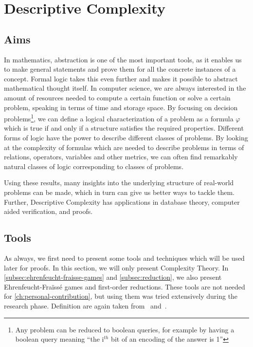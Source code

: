 

\chapter{Descriptive Complexity}\label{ch:descriptive-complexity}


\section{Aims}\label{sec:aims}

In mathematics, abstraction is one of the most important tools, as it enables us to make general statements and prove them for all the concrete instances of a concept.
Formal logic takes this even further and makes it possible to abstract mathematical thought itself.
In computer science, we are always interested in the amount of resources needed to compute a certain function or solve a certain problem, speaking in terms of time and storage space.
By focusing on decision problems\footnote{Any problem can be reduced to boolean queries, for example by having a boolean query meaning ``the i$^{th}$ bit of an encoding of the answer is 1''}, we can define a logical characterization of a problem as a formula $\varphi$ which is true if and only if a structure satisfies the required properties.
Different forms of logic have the power to describe different classes of problems.
By looking at the complexity of formulas which are needed to describe problems in terms of relations, operators, variables and other metrics, we can often find remarkably natural classes of logic corresponding to classes of problems.

Using these results, many insights into the underlying structure of real-world problems can be made, which in turn can give us better ways to tackle them.
Further, Descriptive Complexity has applications in database theory, computer aided verification, and proofs.


\section{Tools}\label{sec:tools}

As always, we first need to present some tools and techniques which will be used later for proofs.
In this section, we will only present Complexity Theory.
In \cref{subsec:ehrenfeucht-fraisse-games} and \cref{subsec:reduction}, we also present Ehrenfeucht-Fraïssé games and first-order reductions.
These tools are not needed for \cref{ch:personal-contribution}, but using them was tried extensively during the research phase.
Definition are again taken from~\cite{theory-cs} and~\cite{descriptive-complexity}.

